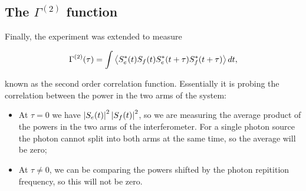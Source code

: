  \subsection{The $ \Gamma^{(2)} $ function}
 Finally, the experiment was extended to measure
  
  \begin{equation}\label{key}
    \Gamma^{(2)}(\tau) = \int \left\langle S_{e}^{*}(t)S_{f}(t)S_{e}^{*}(t+\tau)S_{f}^{*}(t+\tau) \right\rangle dt,
  \end{equation}
  
  \noindent known  as the  second order  correlation function. Essentially  it is  probing the
  correlation between the power in the two arms of the system:
  
  \begin{itemize}
  \item At  $ \tau  = 0  $ we have  $ \left|S_{e}(t)\right|^2\left|S_{f}(t)\right|^2  $, so  we are
    measuring the average product  of the powers in the two arms of  the interferometer. For a
    single photon  source the  photon cannot split  into both  arms at the  same time,  so the
    average will be zero;
  \item  At $  \tau  \neq 0$,  we can  be  comparing the  powers  shifted by  the photon  repitition
    frequency, so this will not be zero.
  	
      
  \end{itemize}

\newpage
